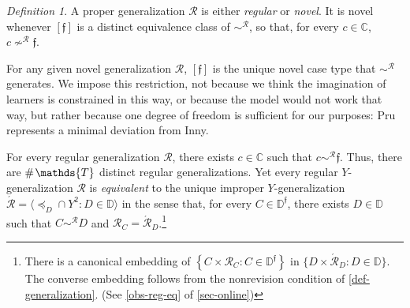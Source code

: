 \documentclass[ecta,nameyear,draft]{econsocart}
\makeatletter
\newcommand{\Ext}{\operatorname{ext}}
\newcommand{\countof}{\mathbin{\#}\hskip1pt}
\newcommand{\mc}{\mathcal}
\newcommand{\novel}{\mathfrak f}
\newcommand{\preceqb}{\mathbin{\preceq}}
\newcommand{\ext}{\mathrel{\mc R}}
\newcommand{\supext}{{\ext}}
\newcommand{\extb}{\mathbin{\mc R}}
\newcommand{\aext}{\mathrel{\acute{\mathrel{\mathcal R}}}}
\newcommand{\aextb}{\mathbin{\acute{\mathbin{\mathcal R}}}}
\newcommand{\mbbd}{{\mathds D}}
\newcommand{\mbbdp}{{\mathds D^{\novel}}}
\newcommand{\mbbc}{{\mathds C}}
\newcommand{\mbbt}{{\mathds {T}}}
\newcommand\ie{i\@.e\@ifnextchar.{}{.\@}}
\theoremstyle{plain}
\theoremstyle{remark}
\newtheorem*{definition*}{Definition}
\makeatother
\begin{document}
\begin{definition*}\label{def-novel} A proper {generalization} $\ext$ is either
  \emph{regular} or \emph{novel}.  It is novel whenever $[\novel]$ is a
  distinct equivalence class of $\sim^{\supext}$, so that, for every $c \in
  \mbbc$, $c \nsim^\supext \novel$.
\end{definition*}

For any given novel {generalization} $\ext$, $[\novel]$ is the unique novel
case type that $\sim^{\extb}$ generates.  We impose this restriction, not
because we think the imagination of learners is constrained in this way, or
because the model would not work that way, but rather because one degree of
freedom is sufficient for our purposes: {Pru} represents a minimal deviation
from Inny.


For every regular {generalization} $\ext$, there exists $c \in \mbbc$ such that
$c \sim^{\extb} \novel$. Thus, there are $\countof{\mbbt}$ distinct regular
{generalization}s. Yet every regular $Y$-{generalization} $\ext$ is
\emph{equivalent} to the unique improper
$Y$-{generalization} $\aext = \langle \preceqb_{D} \cap Y^{2}: D \in
\mbbd\rangle$ in the sense that, for every $C \in \mbbdp$, there exists $D \in
\mbbd$ such that $C \sim^{\extb} D$ and $\extb_{C} =
\aextb_{D}$.\footnote{There is a canonical embedding of $\left\{C \times
  \extb_{C}: C \in \mbbdp\right\}$
  in $\{D \times \aextb_{D}: D \in \mbbd\}$. The converse embedding follows
  from the nonrevision condition of \cref{def-generalization}. (See
\cref{obs-reg-eq} of \cref{sec-online})}
\end{document}
